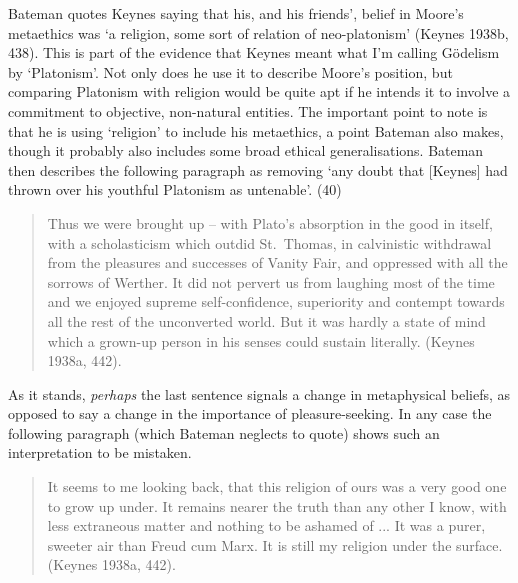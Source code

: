 \documentclass[noflushend]{philosophersimprint}
\begin{document}
Bateman quotes Keynes saying that his, and his friends', belief in
Moore's metaethics was `a religion, some sort of relation of
neo-platonism' (Keynes 1938b, 438). This is part of the evidence that
Keynes meant what I'm calling Gödelism by `Platonism'. Not only does he
use it to describe Moore's position, but comparing Platonism with
religion would be quite apt if he intends it to involve a commitment to
objective, non-natural entities. The important point to note is that he
is using `religion' to include his metaethics, a point Bateman also
makes, though it probably also includes some broad ethical
generalisations. Bateman then describes the following paragraph as
removing `any doubt that {[}Keynes{]} had thrown over his youthful
Platonism as untenable'. (40)

\begin{quote}
Thus we were brought up -- with Plato's absorption in the good in
itself, with a scholasticism which outdid St.~Thomas, in calvinistic
withdrawal from the pleasures and successes of Vanity Fair, and
oppressed with all the sorrows of Werther. It did not pervert us from
laughing most of the time and we enjoyed supreme self-confidence,
superiority and contempt towards all the rest of the unconverted world.
But it was hardly a state of mind which a grown-up person in his senses
could sustain literally. (Keynes 1938a, 442).
\end{quote}

As it stands, \emph{perhaps} the last sentence signals a change in
metaphysical beliefs, as opposed to say a change in the importance of
pleasure-seeking. In any case the following paragraph (which Bateman
neglects to quote) shows such an interpretation to be mistaken.

\begin{quote}
It seems to me looking back, that this religion of ours was a very good
one to grow up under. It remains nearer the truth than any other I know,
with less extraneous matter and nothing to be ashamed of ... It was a
purer, sweeter air than Freud cum Marx. It is still my religion under
the surface. (Keynes 1938a, 442).
\end{quote}
\end{document}

